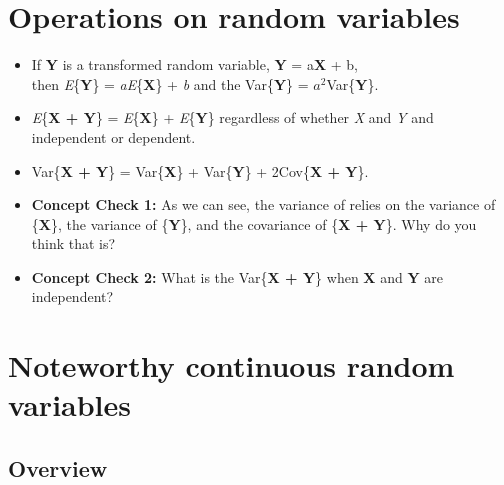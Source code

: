 \documentclass[12pt]{report}
\begin{document}
\section{Operations on random variables}

\begin{itemize}

\item If \textbf{Y} is a transformed random variable, \textbf{Y} = a\textbf{X} + b, \\ 
then \textit{E}\{\textbf{Y}\} = \textit{aE}\{\textbf{X}\} + \textit{b} and the Var\{\textbf{Y}\} = $a^{2}$Var\{\textbf{Y}\}.

\item  \textit{E}\{\textbf{X + Y}\} = \textit{E}\{\textbf{X}\} + \textit{E}\{\textbf{Y}\} regardless of whether \textit{X} and \textit{Y} and independent or dependent. \\

\item Var\{\textbf{X + Y}\} = Var\{\textbf{X}\} + Var\{\textbf{Y}\} + 2Cov\{\textbf{X + Y}\}. \\

\item \textbf{Concept Check 1:} As we can see, the variance of  relies on the variance of \{\textbf{X}\}, the variance of \{\textbf{Y}\}, and the covariance of \{\textbf{X + Y}\}. Why do you think that is? 


\bigskip

\bigskip

\bigskip
\item \textbf{Concept Check 2:}  What is the Var\{\textbf{X + Y}\} when \textbf{X} and \textbf{Y} are independent? 

\end{itemize}

\bigskip

\bigskip

\bigskip
\section{Noteworthy continuous random variables}

\subsection{Overview}
\end{document}
